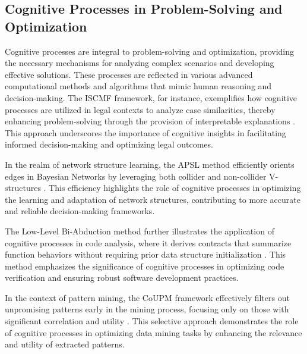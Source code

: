 \subsection{Cognitive Processes in Problem-Solving and Optimization} \label{subsec:Cognitive Processes in Problem-Solving and Optimization}



Cognitive processes are integral to problem-solving and optimization, providing the necessary mechanisms for analyzing complex scenarios and developing effective solutions. These processes are reflected in various advanced computational methods and algorithms that mimic human reasoning and decision-making. The ISCMF framework, for instance, exemplifies how cognitive processes are utilized in legal contexts to analyze case similarities, thereby enhancing problem-solving through the provision of interpretable explanations \cite{lin2023interpretabilityframeworksimilarcase}. This approach underscores the importance of cognitive insights in facilitating informed decision-making and optimizing legal outcomes.



In the realm of network structure learning, the APSL method efficiently orients edges in Bayesian Networks by leveraging both collider and non-collider V-structures \cite{ling2021bayesiannetworkstructurelearning}. This efficiency highlights the role of cognitive processes in optimizing the learning and adaptation of network structures, contributing to more accurate and reliable decision-making frameworks.



The Low-Level Bi-Abduction method further illustrates the application of cognitive processes in code analysis, where it derives contracts that summarize function behaviors without requiring prior data structure initialization \cite{holk2022lowlevelbiabduction}. This method emphasizes the significance of cognitive processes in optimizing code verification and ensuring robust software development practices.



In the context of pattern mining, the CoUPM framework effectively filters out unpromising patterns early in the mining process, focusing only on those with significant correlation and utility \cite{gan2019correlatedutilitybasedpatternmining}. This selective approach demonstrates the role of cognitive processes in optimizing data mining tasks by enhancing the relevance and utility of extracted patterns.



